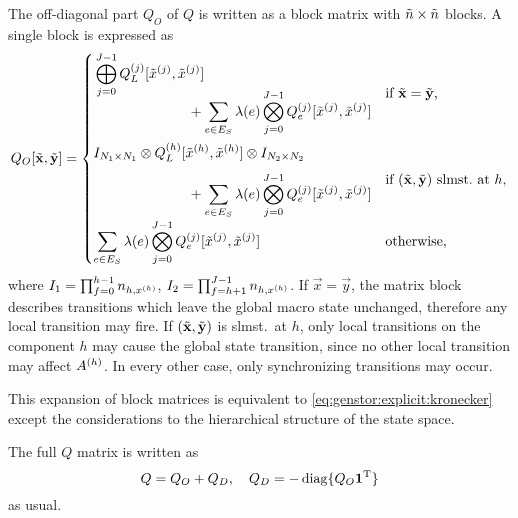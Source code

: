 The off-diagonal part $Q_O$ of $Q$ is written as a block matrix with
$\tilde{n} \times \tilde{n}$ blocks. A single block is expressed as
\begin{equation}
  \label{eq:genstor:explicit:block:block}
  Q_O[\macro{\vec{x}}, \macro{\vec{y}}] = \begin{cases}
    \begin{multlined}[c][7cm]
      \bigkrplus_{j = 0}^{J - 1}
      \loc{Q_L}{j}[\loc{\macro{x}}{j}, \loc{\macro{x}}{j}]\\[-4.5ex]
      + \sum_{e \in E_S} \lambda(e) \bigkrtimes_{j = 0}^{J - 1}
      \loc{Q_e}{j}[\loc{\macro{x}}{j}, \loc{\macro{x}}{j}]
    \end{multlined}
    & \text{if $\macro{\vec{x}} = \macro{\vec{y}}$,} \\[6.5ex]
    \begin{multlined}[c][7cm]
      I_{N_1 \times N_1} \krtimes
      \loc{Q_L}{h}[\loc{\macro{x}}{h}, \loc{\macro{x}}{h}] \krtimes
      I_{N_2 \times N_2} \\[-1.5ex]
      + \sum_{e \in E_S} \lambda(e) \bigkrtimes_{j = 0}^{J - 1}
      \loc{Q_e}{j}[\loc{\macro{x}}{j}, \loc{\macro{x}}{j}]
    \end{multlined}
    & \text{if
      $(\macro{\vec{x}}, \macro{\vec{y}})$ slmst.~at $h$,} \\[5ex]
    \displaystyle \sum_{e \in E_S} \lambda(e) \bigkrtimes_{j = 0}^{J - 1}
      \loc{Q_e}{j}[\loc{\macro{x}}{j}, \loc{\macro{x}}{j}] &
      \text{otherwise,}
  \end{cases}
\end{equation}
where $I_1 = \prod_{f = 0}^{h - 1} n_{h, x^{(h)}}$,
$I_2 = \prod_{f = h + 1}^{J - 1} n_{h, x^{(h)}}$. If
$\vec{x} = \vec{y}$, the matrix block describes transitions which
leave the global macro state unchanged, therefore any local transition
may fire. If $(\tilde{\bm{\mathrm{x}}}, \tilde{\bm{\mathrm{y}}})$ is slmst.~at $h$,
only local transitions on the component $h$ may cause the global state
transition, since no other local transition may affect
$A^{(h)}$. In every other case, only synchronizing transitions may
occur.

This expansion of block matrices is equivalent to
\vref{eq:genstor:explicit:kronecker} except the considerations to the
hierarchical structure of the state space.

The full $Q$ matrix is written as
\begin{equation}
  Q = Q_O + Q_D, \quad Q_D = -\operatorname{diag}\{ Q_O \bm{\mathrm{1}}^{\mathrm{T}} \}
\end{equation}
as usual.
